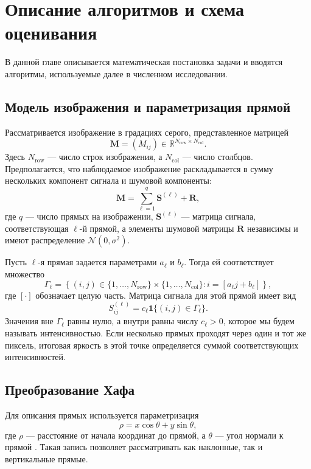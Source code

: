 ﻿%
\chapter{Описание алгоритмов и схема оценивания}

В данной главе описывается математическая постановка задачи и вводятся
алгоритмы, используемые далее в численном исследовании.

\section{Модель изображения и параметризация прямой}

Рассматривается изображение в градациях серого, представленное матрицей
\[
\mathbf{M} = (M_{ij}) \in \mathbb{R}^{N_{\mathrm{row}} \times N_{\mathrm{col}}}.
\]
Здесь $N_{\mathrm{row}}$ --- число строк изображения, а $N_{\mathrm{col}}$ ---
число столбцов. Предполагается, что наблюдаемое изображение раскладывается в
сумму нескольких компонент сигнала и шумовой компоненты:
\[
\mathbf{M} = \sum_{\ell=1}^{q} \mathbf{S}^{(\ell)} + \mathbf{R},
\]
где $q$ --- число прямых на изображении, $\mathbf{S}^{(\ell)}$ --- матрица
сигнала, соответствующая $\ell$-й прямой, а элементы шумовой матрицы
$\mathbf{R}$ независимы и имеют распределение $\mathcal{N}(0,\sigma^2)$.

Пусть $\ell$-я прямая задается параметрами $a_\ell$ и $b_\ell$. Тогда ей
соответствует множество
\[
\Gamma_\ell
=
\left\{
(i,j)\in\{1,\dots,N_{\mathrm{row}}\}\times\{1,\dots,N_{\mathrm{col}}\}
\colon
i = [a_\ell j+b_\ell]
\right\},
\]
где $[\cdot]$ обозначает целую часть. Матрица сигнала для этой прямой имеет вид
\[
S^{(\ell)}_{ij}
=
c_\ell \mathbf{1}\{(i,j)\in\Gamma_\ell\}.
\]
Значения вне $\Gamma_\ell$ равны нулю, а внутри равны числу $c_\ell>0$,
которое мы будем называть интенсивностью. Если несколько прямых проходят через
один и тот же пиксель, итоговая яркость в этой точке определяется суммой
соответствующих интенсивностей.

\section{Преобразование Хафа}

Для описания прямых используется параметризация
\[
\rho = x \cos \theta + y \sin \theta,
\]
где $\rho$ --- расстояние от начала координат до прямой, а $\theta$ --- угол
нормали к прямой \cite{duda1972hough}. Такая запись позволяет рассматривать
как наклонные, так и вертикальные прямые.

